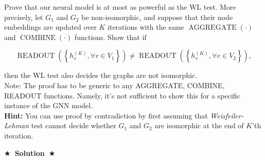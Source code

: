 \documentclass{article}
\numberwithin{figure}{section}
\newcommand{\Solution}[1]{{\medskip \color{red} \bf $\bigstar$~\sf \textbf{Solution}~$\bigstar$ \sf #1 } \bigskip}
\begin{document}
    Prove that our neural model is at most as powerful as the WL test. More precisely, let $G_1$ and $G_2$ be non-isomorphic, and suppose that their node embeddings are updated over $K$ iterations with the same $\operatorname{AGGREGATE}(\cdot)$ and $\operatorname{COMBINE}(\cdot)$ functions. Show that if

    $$\operatorname { READOUT }\left(\left\{h_v^{(K)}, \forall v \in V_1\right\}\right) \neq \operatorname { READOUT }\left(\left\{h_v^{(K)}, \forall v \in V_2\right\}\right),$$

then the WL test also decides the graphs are not isomorphic.\\

Note: The proof has to be generic to any AGGREGATE, COMBINE, READOUT functions. Namely, it's not sufficient to show this for a specific instance of the GNN model.\\

\textbf{Hint:} You can use proof by contradiction by first assuming that \textit{Weisfeiler-Lehman} test cannot decide whether $G_1$ and $G_2$ are isomorphic at the end of $K$’th iteration.

\Solution{}
\end{document}
